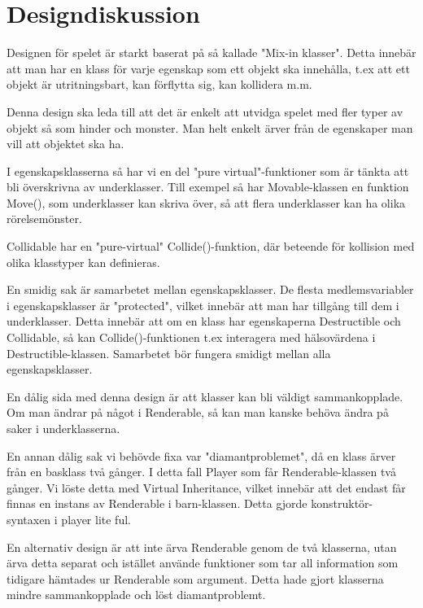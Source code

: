 \documentclass{TDP005mall}
\begin{document}
\section{Designdiskussion}

Designen för spelet är starkt baserat på så kallade "Mix-in klasser". Detta
innebär att man har en klass för varje egenskap som ett objekt ska innehålla,
t.ex att ett objekt är utritningsbart, kan förflytta sig, kan kollidera m.m.

Denna design ska leda till att det är enkelt att utvidga spelet med fler typer
av objekt så som hinder och monster. Man helt enkelt ärver från de egenskaper
man vill att objektet ska ha.

I egenskapsklasserna så har vi en del "pure virtual"-funktioner som är tänkta
att bli överskrivna av underklasser. Till exempel så har Movable-klassen en
funktion Move(), som underklasser kan skriva över, så att flera underklasser
kan ha olika rörelsemönster.

Collidable har en "pure-virtual" Collide()-funktion, där beteende för kollision
med olika klasstyper kan definieras.

En smidig sak är samarbetet mellan egenskapsklasser. De flesta medlemsvariabler
i egenskapsklasser är "protected", vilket innebär att man har tillgång till dem
i underklasser. Detta innebär att om en klass har egenskaperna
Destructible och Collidable, så kan Collide()-funktionen t.ex interagera med
hälsovärdena i Destructible-klassen. Samarbetet bör fungera smidigt mellan alla
egenskapsklasser.

En dålig sida med denna design är att klasser kan bli väldigt sammankopplade.
Om man ändrar på något i Renderable, så kan man kanske behöva ändra på saker i
underklasserna.

En annan dålig sak vi behövde fixa var "diamantproblemet", då en klass ärver
från en basklass två gånger. I detta fall Player som får Renderable-klassen två
gånger. Vi löste detta med Virtual Inheritance, vilket innebär att det endast
får finnas en instans av Renderable i barn-klassen. Detta gjorde konstruktör-
syntaxen i player lite ful.

En alternativ design är att inte ärva Renderable genom de två klasserna, utan
ärva detta separat och istället använde funktioner som tar all information som
tidigare hämtades ur Renderable som argument. Detta hade gjort klasserna mindre
sammankopplade och löst diamantproblemt.
\end{document}
